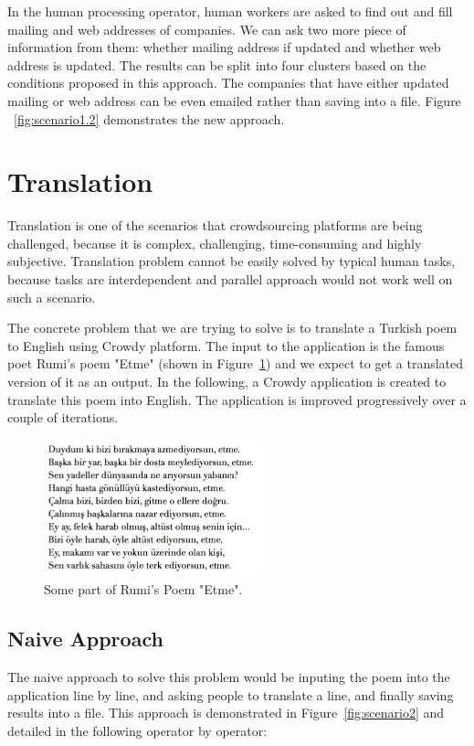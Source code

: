 In the human processing operator, human workers are asked to find out and fill mailing and web addresses of companies. We can ask two more piece of information from them: whether mailing address if updated and whether web address is updated. The results can be split into four clusters based on the conditions proposed in this approach. The companies that have either updated mailing or web address can be even emailed rather than saving into a file. Figure ~\ref{fig:scenario1.2} demonstrates the new approach.

\section{Translation}
Translation is one of the scenarios that crowdsourcing platforms are being challenged, because it is complex, challenging, time-consuming and highly subjective. Translation problem cannot be easily solved by typical human tasks, because tasks are interdependent and parallel approach would not work well on such a scenario.

The concrete problem that we are trying to solve is to translate a Turkish poem to English using Crowdy platform. The input to the application is the famous poet Rumi's poem "Etme" (shown in Figure~\ref{fig:scenario2.poem}) and we expect to get a translated version of it as an output. In the following, a Crowdy application  is created to translate this poem into English. The application is improved progressively over a couple of iterations.

\begin{figure}[ht]
	\centering
	\includegraphics[height=150px]{figures/scenarios/poem.png}
	\caption{Some part of Rumi's Poem "Etme".}
	\label{fig:scenario2.poem}
\end{figure}

\subsection{Naive Approach}
The naive approach to solve this problem would be inputing the poem into the application line by line, and asking people to translate a line, and finally saving results into a file. This approach is demonstrated in Figure~\ref{fig:scenario2} and detailed in the following operator by operator:

